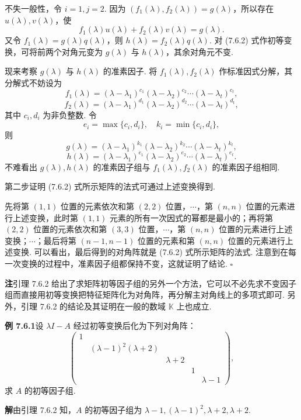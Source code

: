 \documentclass[UTF8, 12pt, fontset=fandol, oneside]{ctexart}
\begin{document}
不失一般性，令 $i=1,j=2$. 因为 $(f_1(\lambda),f_2(\lambda))=g(\lambda)$，所以存在 $u(\lambda),v(\lambda)$，使
\[
f_1(\lambda)u(\lambda)+f_2(\lambda)v(\lambda)=g(\lambda).
\]
又令 $f_1(\lambda)=g(\lambda)q(\lambda)$，则 $h(\lambda)=f_2(\lambda)q(\lambda)$. 对 (7.6.2) 式作初等变换，可将前两个对角元变为 $g(\lambda)$ 与 $h(\lambda)$，其余对角元不变.

现来考察 $g(\lambda)$ 与 $h(\lambda)$ 的准素因子. 将 $f_1(\lambda),f_2(\lambda)$ 作标准因式分解，其分解式不妨设为
\[
f_1(\lambda)=(\lambda-\lambda_1)^{c_1}(\lambda-\lambda_2)^{c_2}\cdots(\lambda-\lambda_t)^{c_t},
\]
\[
f_2(\lambda)=(\lambda-\lambda_1)^{d_1}(\lambda-\lambda_2)^{d_2}\cdots(\lambda-\lambda_t)^{d_t},
\]
其中 $c_i,d_i$ 为非负整数. 令
\[
e_i=\max\{c_i,d_i\},\quad k_i=\min\{c_i,d_i\},
\]
则
\[
g(\lambda)=(\lambda-\lambda_1)^{k_1}(\lambda-\lambda_2)^{k_2}\cdots(\lambda-\lambda_t)^{k_t},
\]
\[
h(\lambda)=(\lambda-\lambda_1)^{e_1}(\lambda-\lambda_2)^{e_2}\cdots(\lambda-\lambda_t)^{e_t}.
\]
不难看出 $g(\lambda),h(\lambda)$ 的准素因子组与 $f_1(\lambda),f_2(\lambda)$ 的准素因子组相同.

第二步证明 (7.6.2) 式所示矩阵的法式可通过上述变换得到.

先将第 $(1,1)$ 位置的元素依次和第 $(2,2)$ 位置，$\cdots$，第 $(n,n)$ 位置的元素进行上述变换，此时第 $(1,1)$ 元素的所有一次因式的幂都是最小的；再将第 $(2,2)$ 位置的元素依次和第 $(3,3)$ 位置，$\cdots$，第 $(n,n)$ 位置的元素进行上述变换；$\cdots$；最后将第 $(n-1,n-1)$ 位置的元素和第 $(n,n)$ 位置的元素进行上述变换. 可以看出，最后得到的对角阵就是 (7.6.2) 式所示矩阵的法式. 注意到在每一次变换的过程中，准素因子组都保持不变，这就证明了结论. $\square$

\noindent\textbf{注}\quad 引理 7.6.2 给出了求矩阵初等因子组的另外一个方法，它可以不必先求不变因子组而直接用初等变换把特征矩阵化为对角阵，再分解主对角线上的多项式即可. 另外，引理 7.6.2 的结论及其证明在一般的数域 $\mathbb{K}$ 上也成立.

\noindent\textbf{例 7.6.1}\quad 设 $\lambda I-A$ 经过初等变换后化为下列对角阵：
\[
\left(\begin{array}{ccccc}
1 & & & & \\
& (\lambda-1)^2(\lambda+2) & & & \\
& & \lambda+2 & & \\
& & & 1 & \\
& & & & \lambda-1
\end{array}\right),
\]
求 $A$ 的初等因子组.

\noindent\textbf{解}\quad 由引理 7.6.2 知，$A$ 的初等因子组为 $\lambda-1,(\lambda-1)^2,\lambda+2,\lambda+2$.
\end{document}
